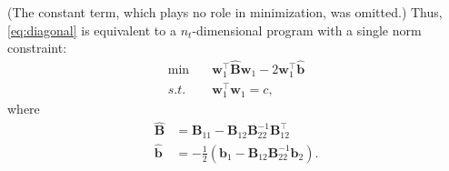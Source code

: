 \documentclass[journal,twoside]{IEEEtran}
\renewcommand{\vec}[1]{\mathbf{#1}}
\begin{document}
(The constant term, which plays no role in minimization, was omitted.) Thus, \eqref{eq:diagonal} is equivalent to a $n_t$-dimensional program with a single norm constraint:
\begin{subequations}\label{eq:eliminated}
\begin{align}
\min\quad & \vec{w}_1^\top \hat{\mathbf{B}}\vec{w}_1 - 2\vec{w}_1^\top \hat{\vec{b}} \\
\label{eq:eliminated-quad} s.t.\quad & \vec{w}_1^\top \vec{w}_1 = c,
\end{align}
\end{subequations}
where
\begin{align*}
\hat{\mathbf{B}} &= \mathbf{B}_{11} - \mathbf{B}_{12} \mathbf{B}_{22}^{-1}
\mathbf{B}_{12}^\top \\
\hat{\vec{b}} &= -\frac{1}{2}\left(\vec{b}_1 - \mathbf{B}_{12} \mathbf{B}_{22}^{-1}\vec{b}_2\right).
\end{align*}
\end{document}
